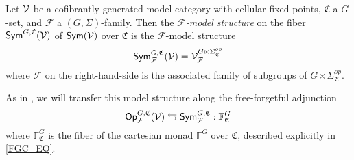 \documentclass[a4paper,10pt
,draft
]{article}%
\renewcommand{\F}{\mathcal F}
\renewcommand{\1}{\eta}%
\newcommand{\UC}{\underline{\mathfrak C}}
\begin{document}
\begin{definition}
      Let $\mathcal V$ be a cofibrantly generated model category with cellular fixed points,
      $\mathfrak C$ a $G$-set, and $\F$ a $(G, \Sigma)$-family.
      Then the \textit{$\F$-model structure} on the fiber $\mathsf{Sym}^{G,\mathfrak C}(\mathcal V)$ of $\mathsf{Sym}(\mathcal V)$ over $\mathfrak C$
      is the $\F$-model structure
      \begin{equation}
            \Sym^{G,\mathfrak C}_\F(\V) = \V^{G \ltimes \Sigma_{\mathfrak C}^{op}}_{\F}
      \end{equation}
      where $\F$ on the right-hand-side is the associated family of subgroups of $G \ltimes \Sigma_{\mathfrak C}^{op}$.
\end{definition}



As in \cite{BP_geo}, we will transfer this model structure along the free-forgetful adjunction
\[
      \Op^{G, \mathfrak C}_\F(\V) \leftrightarrows \Sym^{G, \mathfrak C}_\F: \mathbb F^G_{\mathfrak C}
\]
where $\mathbb F^G_{\mathfrak C}$ is the fiber of the cartesian monad $\mathbb F^G$ over $\mathfrak C$,
described explicitly in \eqref{FGC_EQ}.
\end{document}
